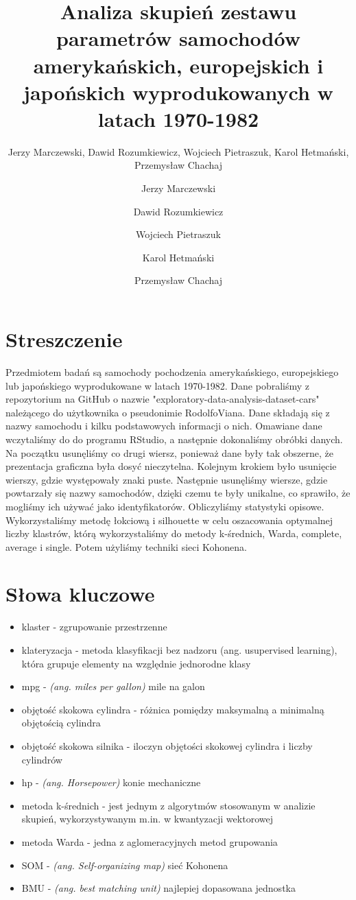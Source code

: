 \documentclass{article}
\title{Analiza skupień zestawu parametrów samochodów amerykańskich, europejskich i japońskich wyprodukowanych w latach 1970-1982}
\author{\fontsize{11}{13}\selectfont Jerzy Marczewski, \newline Dawid Rozumkiewicz, Wojciech Pietraszuk, Karol Hetmański, Przemysław Chachaj}
\author{
  Jerzy Marczewski\\
  \and
  Dawid Rozumkiewicz\\
  \and
  Wojciech Pietraszuk\\
  \and
  Karol Hetmański\\
  \and
  Przemysław Chachaj\\
}
\date{}
\begin{document}
\maketitle

\section{Streszczenie}
Przedmiotem badań są samochody pochodzenia amerykańskiego, europejskiego lub japońskiego wyprodukowane
w latach 1970-1982. Dane pobraliśmy z repozytorium na GitHub o nazwie "exploratory-data-analysis-dataset-cars" 
należącego do użytkownika o pseudonimie RodolfoViana. Dane składają się z nazwy samochodu i kilku podstawowych 
informacji o nich. Omawiane dane wczytaliśmy do do programu RStudio, a następnie dokonaliśmy obróbki danych.
Na początku usunęliśmy co drugi wiersz, ponieważ dane były tak obszerne, że prezentacja graficzna była dosyć nieczytelna.
Kolejnym krokiem było usunięcie wierszy, gdzie występowały znaki puste. Następnie usunęliśmy wiersze, gdzie powtarzały się 
nazwy samochodów, dzięki czemu te były unikalne, co sprawiło, że mogliśmy ich używać jako identyfikatorów. 
Obliczyliśmy statystyki opisowe. Wykorzystaliśmy metodę łokciową i silhouette w celu oszacowania optymalnej liczby klastrów, 
którą wykorzystaliśmy do metody k-średnich, Warda, complete, average i single. Potem użyliśmy techniki sieci Kohonena.


\section{Słowa kluczowe}
    \begin{itemize}
        \item klaster - zgrupowanie przestrzenne 
        \item klateryzacja - metoda klasyfikacji bez nadzoru (ang. usupervised learning), która grupuje elementy na względnie jednorodne klasy
        \item mpg - \textit{(ang. miles per gallon)} mile na galon
        \item objętość skokowa cylindra - różnica pomiędzy maksymalną a minimalną objętością cylindra
        \item objętość skokowa silnika - iloczyn objętości skokowej cylindra i liczby cylindrów
        \item hp - \textit{(ang. Horsepower)} konie mechaniczne
        \item metoda k-średnich - jest jednym z algorytmów stosowanym w analizie skupień, wykorzystywanym m.in. w kwantyzacji wektorowej
        \item metoda Warda -  jedna z aglomeracyjnych metod grupowania
        \item SOM - \textit{(ang. Self-organizing map)} sieć Kohonena 
        \item BMU - \textit{(ang. best matching unit)} najlepiej dopasowana jednostka
    \end{itemize}
\end{document}
